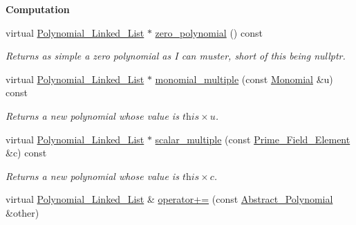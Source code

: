 \begin{Indent}\textbf{ Computation}\par
\begin{DoxyCompactItemize}
\item 
\mbox{\label{class_polynomial___linked___list_adae47a0dac8cb80c004bdc7553864918}} 
virtual \hyperlink{class_polynomial___linked___list}{Polynomial\+\_\+\+Linked\+\_\+\+List} $\ast$ \hyperlink{class_polynomial___linked___list_adae47a0dac8cb80c004bdc7553864918}{zero\+\_\+polynomial} () const
\begin{DoxyCompactList}\small\item\em Returns as simple a zero polynomial as I can muster, short of this being {\ttfamily nullptr}. \end{DoxyCompactList}\item 
\mbox{\label{class_polynomial___linked___list_a18b3e74a8515cca9b1f92889cd30c388}} 
virtual \hyperlink{class_polynomial___linked___list}{Polynomial\+\_\+\+Linked\+\_\+\+List} $\ast$ \hyperlink{class_polynomial___linked___list_a18b3e74a8515cca9b1f92889cd30c388}{monomial\+\_\+multiple} (const \hyperlink{class_monomial}{Monomial} \&u) const
\begin{DoxyCompactList}\small\item\em Returns a new polynomial whose value is $\textit{this}\times u$. \end{DoxyCompactList}\item 
\mbox{\label{class_polynomial___linked___list_a00e8a185ab2a34360c3d5250398df4c1}} 
virtual \hyperlink{class_polynomial___linked___list}{Polynomial\+\_\+\+Linked\+\_\+\+List} $\ast$ \hyperlink{class_polynomial___linked___list_a00e8a185ab2a34360c3d5250398df4c1}{scalar\+\_\+multiple} (const \hyperlink{class_prime___field___element}{Prime\+\_\+\+Field\+\_\+\+Element} \&c) const
\begin{DoxyCompactList}\small\item\em Returns a new polynomial whose value is $\textit{this}\times c$. \end{DoxyCompactList}\item 
\mbox{\label{class_polynomial___linked___list_a6dffc06a0facc9807d24d0df7441afbc}} 
virtual \hyperlink{class_polynomial___linked___list}{Polynomial\+\_\+\+Linked\+\_\+\+List} \& \hyperlink{class_polynomial___linked___list_a6dffc06a0facc9807d24d0df7441afbc}{operator+=} (const \hyperlink{class_abstract___polynomial}{Abstract\+\_\+\+Polynomial} \&other)

\end{DoxyCompactItemize}
\end{Indent}
